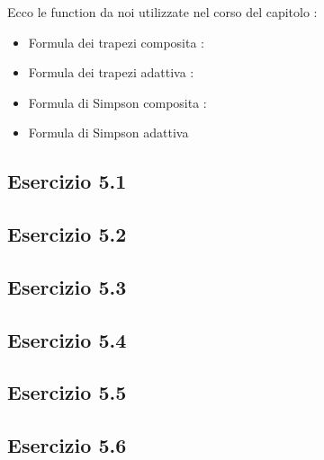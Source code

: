 Ecco le function da noi utilizzate nel corso del capitolo :

\begin{itemize}

\item Formula dei trapezi composita :


\item Formula dei trapezi adattiva :


\item Formula di Simpson composita :


\item Formula di Simpson adattiva


\end{itemize}

\subsection{\textbf{Esercizio 5.1}}

\subsection{\textbf{Esercizio 5.2}}

\subsection{\textbf{Esercizio 5.3}}

\subsection{\textbf{Esercizio 5.4}}

\subsection{\textbf{Esercizio 5.5}}

\subsection{\textbf{Esercizio 5.6}}

